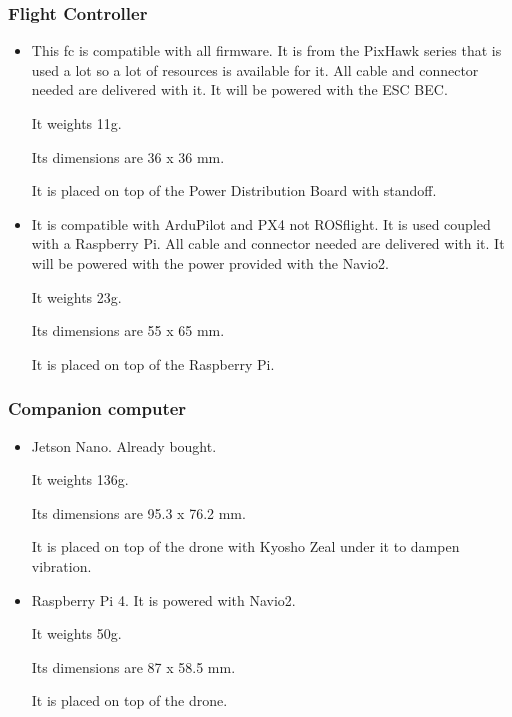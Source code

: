             \subsubsection{Flight Controller}
                \begin{itemize}
                    \item This \gls{fc} is compatible with all firmware. It is from the PixHawk series that is used a lot so a lot of resources is available for it. All cable and connector needed are delivered with it. It will be powered with the ESC BEC.
                    
                    It weights 11g.
                    
                    Its dimensions are 36 x 36 mm.
                    
                    It is placed on top of the Power Distribution Board with standoff.
                    
                    \item It is compatible with ArduPilot and PX4 not ROSflight. It is used coupled with a Raspberry Pi. All cable and connector needed are delivered with it. It will be powered with the power provided with the Navio2.
                    
                    It weights 23g.
                    
                    Its dimensions are 55 x 65 mm.
                    
                    It is placed on top of the Raspberry Pi.
                \end{itemize}
                
            \subsubsection{Companion computer}
                \begin{itemize}
                    \item Jetson Nano. Already bought.
                
                    It weights 136g.
                    
                    Its dimensions are 95.3 x 76.2 mm.
                    
                    It is placed on top of the drone with Kyosho Zeal under it to dampen vibration.
                
                    \item Raspberry Pi 4. It is powered with Navio2.
                
                    It weights 50g.
                    
                    Its dimensions are 87 x 58.5 mm.
                    
                    It is placed on top of the drone.
                \end{itemize}
                
